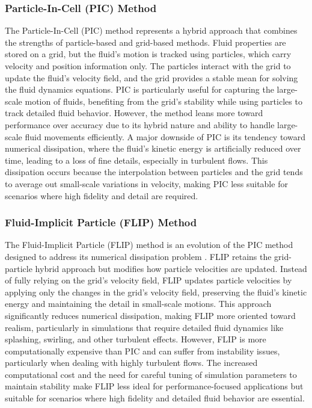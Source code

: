 \subsubsection{Particle-In-Cell (PIC) Method}

The Particle-In-Cell (PIC) method represents a hybrid approach that combines the strengths of particle-based and grid-based methods. Fluid properties are stored on a grid, but the fluid's motion is tracked using particles, which carry velocity and position information only. The particles interact with the grid to update the fluid's velocity field, and the grid provides a stable mean for solving the fluid dynamics equations. PIC is particularly useful for capturing the large-scale motion of fluids, benefiting from the grid's stability while using particles to track detailed fluid behavior. However, the method leans more toward performance over accuracy due to its hybrid nature and ability to handle large-scale fluid movements efficiently. A major downside of PIC is its tendency toward numerical dissipation, where the fluid's kinetic energy is artificially reduced over time, leading to a loss of fine details, especially in turbulent flows. This dissipation occurs because the interpolation between particles and the grid tends to average out small-scale variations in velocity, making PIC less suitable for scenarios where high fidelity and detail are required.

\subsubsection{Fluid-Implicit Particle (FLIP) Method}

The Fluid-Implicit Particle (FLIP) method is an evolution of the PIC method designed to address its numerical dissipation problem \cite{Brackbill1988}. FLIP retains the grid-particle hybrid approach but modifies how particle velocities are updated. Instead of fully relying on the grid's velocity field, FLIP updates particle velocities by applying only the changes in the grid's velocity field, preserving the fluid's kinetic energy and maintaining the detail in small-scale motions. This approach significantly reduces numerical dissipation, making FLIP more oriented toward realism, particularly in simulations that require detailed fluid dynamics like splashing, swirling, and other turbulent effects. However, FLIP is more computationally expensive than PIC and can suffer from instability issues, particularly when dealing with highly turbulent flows. The increased computational cost and the need for careful tuning of simulation parameters to maintain stability make FLIP less ideal for performance-focused applications but suitable for scenarios where high fidelity and detailed fluid behavior are essential.


